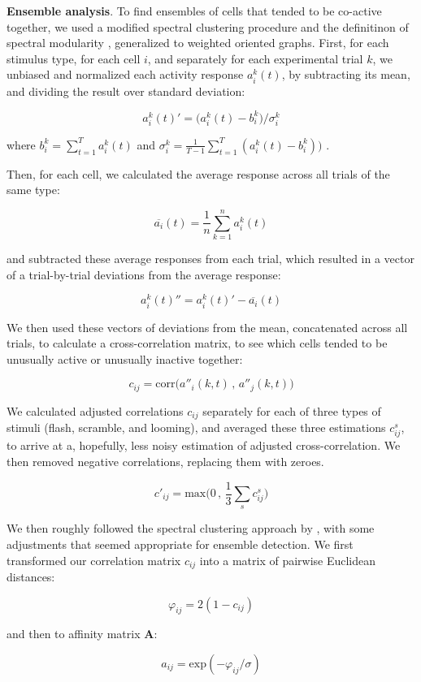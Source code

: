 \documentclass{article}
\begin{document}
\textbf{Ensemble analysis}. To find ensembles of cells that tended to be co-active together, we used a modified spectral clustering procedure \citep{ng2002spectral} and the definitinon of spectral modularity \citep{newman2006modularity}, generalized to weighted oriented graphs. First, for each stimulus type, for each cell $i$, and separately for each experimental trial $k$, we unbiased and normalized each activity response $a^k_i(t)$, by subtracting its mean, and dividing the result over standard deviation:

\[ a^k_i(t)' = \big(a^k_i(t)-b^k_i\big)/\sigma^k_i \]

where $b^k_i = \sum_{t=1}^T{a^k_i(t)}$ and $\sigma^k_i = \frac{1}{T-1}\sum_{t=1}^T{(a^k_i(t) - b^k_i))}$ .

Then, for each cell, we calculated the average response across all trials of the same type: 

\[ \overline{a_i}(t) = \frac{1}{n}\sum_{k=1}^n{a^k_i(t)} \]

and subtracted these average responses from each trial, which resulted in a vector of a trial-by-trial deviations from the average response:

\[ a^k_i(t)'' = a^k_i(t)' - \overline{a_i}(t) \]

We then used these vectors of deviations from the mean, concatenated across all trials, to calculate a cross-correlation matrix, to see which cells tended to be unusually active or unusually inactive together:

\[ c_{ij} = \text{corr}\big(a''_i(k,t)\, , \, a''_j(k,t)\big) \]

We calculated adjusted correlations $c_{ij}$ separately for each of three types of stimuli (flash, scramble, and looming), and averaged these three estimations $c_{ij}^s$, to arrive at a, hopefully, less noisy estimation of adjusted cross-correlation. We then removed negative correlations, replacing them with zeroes.

\[ c'_{ij} = \text{max}\big(0 \, , \, \frac{1}{3} \sum_{s}{c_{ij}^s}\big) \]

We then roughly followed the spectral clustering approach by \citep{ng2002spectral}, with some adjustments that seemed appropriate for ensemble detection. We first transformed our correlation matrix $c_{ij}$ into a matrix of pairwise Euclidean distances:

\[ \varphi_{ij} = 2(1-c_{ij}) \]

and then to affinity matrix $\textbf{A}$:

\[ a_{ij} = \text{exp}(-\varphi_{ij}/\sigma) \]
\end{document}
